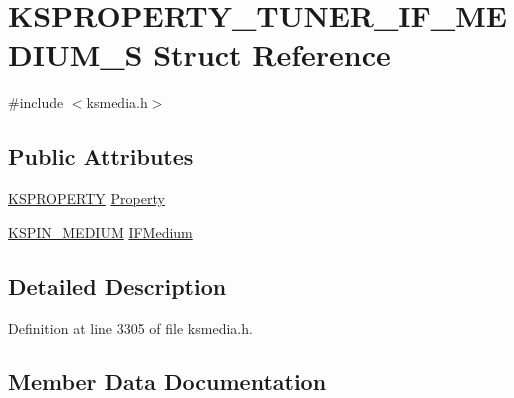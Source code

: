 \hypertarget{struct_k_s_p_r_o_p_e_r_t_y___t_u_n_e_r___i_f___m_e_d_i_u_m___s}{}\section{K\+S\+P\+R\+O\+P\+E\+R\+T\+Y\+\_\+\+T\+U\+N\+E\+R\+\_\+\+I\+F\+\_\+\+M\+E\+D\+I\+U\+M\+\_\+S Struct Reference}
\label{struct_k_s_p_r_o_p_e_r_t_y___t_u_n_e_r___i_f___m_e_d_i_u_m___s}


{\ttfamily \#include $<$ksmedia.\+h$>$}

\subsection*{Public Attributes}
\begin{DoxyCompactItemize}
\item 
\hyperlink{ks_8h_a4392f77c74e868d813d46c39ada4d660}{K\+S\+P\+R\+O\+P\+E\+R\+TY} \hyperlink{struct_k_s_p_r_o_p_e_r_t_y___t_u_n_e_r___i_f___m_e_d_i_u_m___s_a926e97ba6be227310a8b23513703f9a4}{Property}
\item 
\hyperlink{ks_8h_a1e8ded652cd6544c903137c8e662d69f}{K\+S\+P\+I\+N\+\_\+\+M\+E\+D\+I\+UM} \hyperlink{struct_k_s_p_r_o_p_e_r_t_y___t_u_n_e_r___i_f___m_e_d_i_u_m___s_ae9abba34bcbc18be48c64c51cd7f0d16}{I\+F\+Medium}
\end{DoxyCompactItemize}


\subsection{Detailed Description}


Definition at line 3305 of file ksmedia.\+h.



\subsection{Member Data Documentation}

